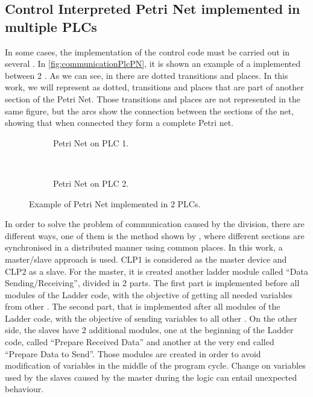 \subsection{Control Interpreted Petri Net implemented in multiple PLCs}
\label{sec:multiplePlcs}
In some cases, the implementation of the control code must be carried out in
several \PLCs.
In \autoref{fig:communicationPlcPN}, it is shown an example of a \CIPN{} implemented
between 2 \PLCs.
As we can see, in 
there are dotted transitions and places. In this work, we will represent as
dotted, transitions and places that are part of another section of the Petri
Net.
Those transitions and places are not represented in the same figure, 
but the arcs show the connection between the sections of the net, showing that
when connected they form a complete Petri net.
\begin{figure}[H]
  \centering
  \begin{subfigure}[t]{0.5\textwidth}
    \center
    \caption{Petri Net on PLC 1.}
    \label{fig:communicationPlcPN1}
  \end{subfigure}%
  ~
  \begin{subfigure}[t]{0.5\textwidth}
    \centering
    \caption{Petri Net on PLC 2.}
    \label{fig:communicationPlcPN2}
  \end{subfigure}
  \caption{Example of Petri Net implemented in 2 PLCs.}
  \label{fig:communicationPlcPN}
\end{figure}

In order to solve the problem of communication caused by the division, there are
different ways, one of them is the method shown by \cite{antunesfloriano2019sincronizacao}, where
different sections are synchronised in a distributed manner using common places.
In this work, a master\slash slave approach is used. CLP1 is considered as the
master device and CLP2 as a slave. For the master, it is created another ladder module
called ``Data Sending\slash Receiving'', divided in 2 parts.
The first part is implemented before all modules of the Ladder code, with the objective of getting all needed
variables from other \PLCs.
The second part, that is implemented after all modules of the Ladder code, with the objective of sending variables to all other \PLCs.
On the other side, the slaves have 2 additional modules, one at the beginning of
the Ladder code, called
``Prepare Received Data'' and another at the very end called ``Prepare Data to
Send''.
Those modules are created in order to avoid modification of variables in the
middle of the program cycle. Change on variables used by the
slaves \PLCs{} caused by the master during the logic can entail unexpected behaviour. 

